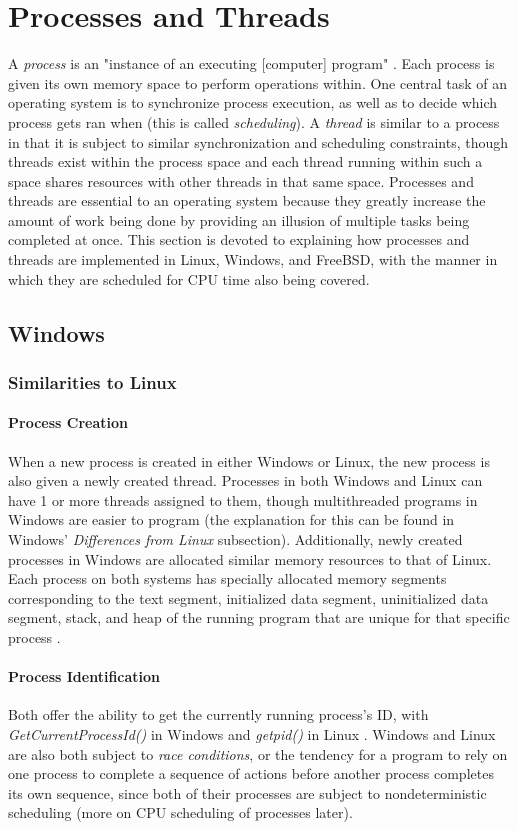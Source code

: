 \documentclass[letterpaper,10pt,titlepage]{article}
\begin{document}
\section{Processes and Threads}
A \emph{process} is an "instance of an executing [computer] program" \cite{linux1}. Each process is given its own memory space to perform operations within. One central task of an operating system is to synchronize process execution, as well as to decide which process gets ran when (this is called \emph{scheduling}). A \emph{thread} is similar to a process in that it is subject to similar synchronization and scheduling constraints, though threads exist within the process space and each thread running within such a space shares resources with other threads in that same space. Processes and threads are essential to an operating system because they greatly increase the amount of work being done by providing an illusion of multiple tasks being completed at once. This section is devoted to explaining how processes and threads are implemented in Linux, Windows, and FreeBSD, with the manner in which they are scheduled for CPU time also being covered.

\subsection{Windows}
% 
%
%
\subsubsection{Similarities to Linux}
\paragraph{Process Creation}
When a new process is created in either Windows or Linux, the new process is also given a newly created thread. Processes in both Windows and Linux can have 1 or more threads assigned to them, though multithreaded programs in Windows are easier to program (the explanation for this can be found in Windows' \emph{Differences from Linux} subsection). Additionally, newly created processes in Windows are allocated similar memory resources to that of Linux. Each process on both systems has specially allocated memory segments corresponding to the text segment, initialized data segment, uninitialized data segment, stack, and heap of the running program that are unique for that specific process \cite{windows1}.
\paragraph{Process Identification}
Both offer the ability to get the currently running process's ID, with \emph{GetCurrentProcessId()} in Windows and \emph{getpid()} in Linux \cite{windows1} \cite{linux1}. Windows and Linux are also both subject to \emph{race conditions}, or the tendency for a program to rely on one process to complete a sequence of actions before another process completes its own sequence, since both of their processes are subject to nondeterministic scheduling (more on CPU scheduling of processes later).
\end{document}
